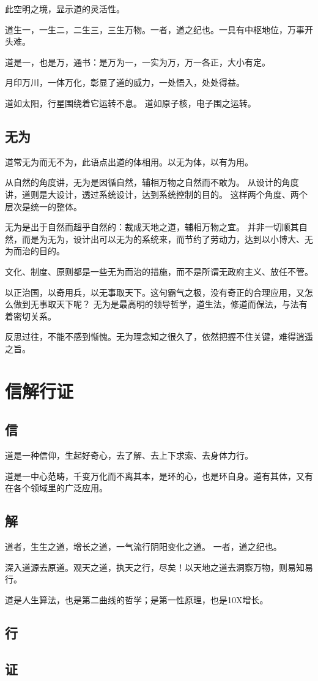 此空明之境，显示道的灵活性。

道生一，一生二，二生三，三生万物。一者，道之纪也。一具有中枢地位，万事开头难。

道是一，也是万，通书：是万为一，一实为万，万一各正，大小有定。

月印万川，一体万化，彰显了道的威力，一处悟入，处处得益。

道如太阳，行星围绕着它运转不息。
道如原子核，电子围之运转。

\subsection{无为}

道常无为而无不为，此语点出道的体相用。以无为体，以有为用。

从自然的角度讲，无为是因循自然，辅相万物之自然而不敢为。
从设计的角度讲，道则是大设计，透过系统设计，达到系统控制的目的。
这样两个角度、两个层次是统一的整体。

无为是出于自然而超乎自然的：裁成天地之道，辅相万物之宜。
并非一切顺其自然，而是为无为，设计出可以无为的系统来，而节约了劳动力，达到以小博大、无为而治的目的。

文化、制度、原则都是一些无为而治的措施，而不是所谓无政府主义、放任不管。

以正治国，以奇用兵，以无事取天下。这句霸气之极，没有奇正的合理应用，又怎么做到无事取天下呢？
无为是最高明的领导哲学，道生法，修道而保法，与法有着密切关系。

反思过往，不能不感到惭愧。无为理念知之很久了，依然把握不住关键，难得逍遥之旨。

\section{信解行证}

\subsection{信}

道是一种信仰，生起好奇心，去了解、去上下求索、去身体力行。

道是一中心范畴，千变万化而不离其本，是环的心，也是环自身。道有其体，又有在各个领域里的广泛应用。

\subsection{解}

道者，生生之道，增长之道，一气流行阴阳变化之道。
一者，道之纪也。

深入道源去原道。观天之道，执天之行，尽矣！以天地之道去洞察万物，则易知易行。

道是人生算法，也是第二曲线的哲学；是第一性原理，也是10X增长。

\subsection{行}

\subsection{证}

